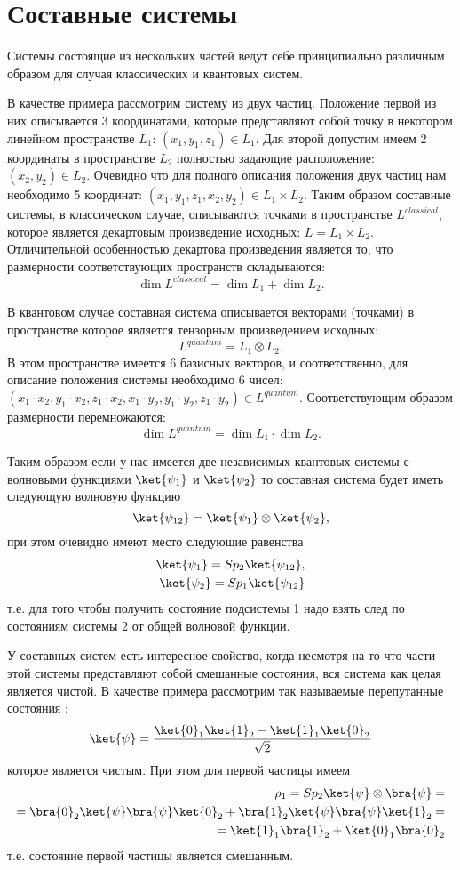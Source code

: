 \section{Составные системы}
\label{sec:add:quantum:composite}
Системы состоящие из нескольких частей ведут себе принципиально
различным образом для случая классических и квантовых систем.


В качестве примера рассмотрим систему из двух частиц. Положение первой
из них описывается 3 координатами, которые представляют собой точку в
некотором линейном пространстве $L_1$: $(x_1, y_1, z_1) \in L_1$. Для второй
допустим имеем 2 координаты в пространстве $L_2$ полностью задающие
расположение:  
$(x_2, y_2) \in L_2$. Очевидно что для полного описания положения двух
частиц нам необходимо 5 координат: $(x_1, y_1, z_1, x_2, y_2) \in L_1
\times L_2$. Таким образом составные системы, в классическом случае,
описываются точками в пространстве $L^{classical}$, которое является декартовым
произведение исходных: $L = L_1 \times L_2$. Отличительной
особенностью декартова произведения является то, что размерности
соответствующих пространств складываются:
\[
\dim{L^{classical}} = \dim{L_1} + \dim{L_2}.
\] 

В квантовом случае составная система описывается векторами (точками) в
пространстве которое является тензорным произведением исходных: 
\[
L^{quantum} = L_1 \otimes L_2.
\]
В этом пространстве имеется 6 базисных векторов, и соответственно, для
описание положения системы необходимо 6 чисел:
$(x_1 \cdot x_2, y_1 \cdot x_2, z_1 \cdot x_2, 
x_1 \cdot y_2, y_1 \cdot y_2, z_1 \cdot y_2) \in L^{quantum}$. 
Соответствующим образом размерности перемножаются:
\[
\dim{L^{quantum}} = \dim{L_1} \cdot \dim{L_2}.
\] 

Таким образом если у нас имеется две независимых квантовых системы с
волновыми функциями $\ket{\psi_1}$ и $\ket{\psi_2}$ то составная
система будет иметь следующую волновую функцию
\[
\ket{\psi_{12}} = \ket{\psi_1} \otimes \ket{\psi_2},
\]
при этом очевидно имеют место следующие равенства 
\begin{eqnarray}
\ket{\psi_1} = Sp_2 \ket{\psi_{12}}, \\
\nonumber
\ket{\psi_2} = Sp_1 \ket{\psi_{12}} 
\nonumber
\end{eqnarray}
т.е. для того чтобы получить состояние подсистемы 1 надо взять след по
состояниям системы 2 от общей волновой функции. 

У составных систем есть интересное свойство, когда несмотря на то что
части этой системы представляют собой смешанные состояния, вся система
как целая является чистой. В качестве примера рассмотрим так
называемые перепутанные состояния :
\[
\ket{\psi} = \frac{\ket{0}_1\ket{1}_2 - \ket{1}_1\ket{0}_2}{\sqrt{2}}
\]
которое является чистым. При этом для первой частицы имеем
\begin{eqnarray}
\rho_1 = Sp_2 \ket{\psi} \otimes \bra{\psi} = 
\nonumber \\
=
\bra{0}_2 \ket{\psi} \bra{\psi} \ket{0}_2 + 
\bra{1}_2 \ket{\psi}\bra{\psi} \ket{1}_2 = 
\nonumber \\
= \ket{1}_1 \bra{1}_2 + 
\ket{0}_1 \bra{0}_2
\nonumber
\end{eqnarray}
т.е. состояние первой частицы является смешанным.
